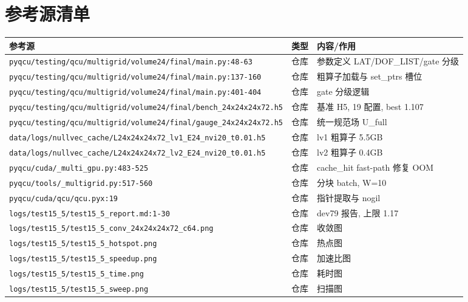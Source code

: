 \documentclass[UTF8]{ctexart}
\begin{document}
\section{参考源清单}
\begin{xltabular}{\textwidth}{llX}
\toprule
\textcolor{evidence}{参考源} & 类型 & 内容/作用 \\
\midrule
\endhead
\texttt{\nolinkurl{pyqcu/testing/qcu/multigrid/volume24/final/main.py:48-63}} & 仓库 & 参数定义 LAT/DOF\_LIST/gate 分级 \\
\texttt{\nolinkurl{pyqcu/testing/qcu/multigrid/volume24/final/main.py:137-160}} & 仓库 & 粗算子加载与 set\_ptrs 槽位 \\
\texttt{\nolinkurl{pyqcu/testing/qcu/multigrid/volume24/final/main.py:401-404}} & 仓库 & gate 分级逻辑 \\
\texttt{\nolinkurl{pyqcu/testing/qcu/multigrid/volume24/final/bench_24x24x24x72.h5}} & 仓库 & 基准 H5, 19 配置, best 1.107 \\
\texttt{\nolinkurl{pyqcu/testing/qcu/multigrid/volume24/final/gauge_24x24x24x72.h5}} & 仓库 & 统一规范场 U\_full \\
\texttt{\nolinkurl{data/logs/nullvec_cache/L24x24x24x72_lv1_E24_nvi20_t0.01.h5}} & 仓库 & lv1 粗算子 5.5GB \\
\texttt{\nolinkurl{data/logs/nullvec_cache/L24x24x24x72_lv2_E24_nvi20_t0.01.h5}} & 仓库 & lv2 粗算子 0.4GB \\
\texttt{\nolinkurl{pyqcu/cuda/_multi_gpu.py:483-525}} & 仓库 & cache\_hit fast-path 修复 OOM \\
\texttt{\nolinkurl{pyqcu/tools/_multigrid.py:517-560}} & 仓库 & 分块 batch, W=10 \\
\texttt{\nolinkurl{pyqcu/cuda/qcu/qcu.pyx:19}} & 仓库 & 指针提取与 nogil \\
\texttt{\nolinkurl{logs/test15_5/test15_5_report.md:1-30}} & 仓库 & dev79 报告, 上限 1.17 \\
\texttt{\nolinkurl{logs/test15_5/test15_5_conv_24x24x24x72_c64.png}} & 仓库 & 收敛图 \\
\texttt{\nolinkurl{logs/test15_5/test15_5_hotspot.png}} & 仓库 & 热点图 \\
\texttt{\nolinkurl{logs/test15_5/test15_5_speedup.png}} & 仓库 & 加速比图 \\
\texttt{\nolinkurl{logs/test15_5/test15_5_time.png}} & 仓库 & 耗时图 \\
\texttt{\nolinkurl{logs/test15_5/test15_5_sweep.png}} & 仓库 & 扫描图 \\

\end{xltabular}
\end{document}
